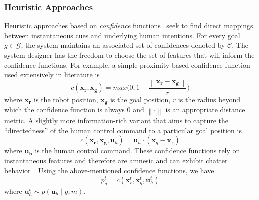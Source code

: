 \documentclass[conference]{IEEEtran}
\newcommand{\norm}[1]{\left\lVert#1\right\rVert}
\begin{document}
\subsubsection{Heuristic Approaches}
Heuristic approaches based on \textit{confidence} functions~\citep{dragan2013policy} seek to find direct mappings between instantaneous cues and underlying human intentions. For every goal $g \in \mathcal{G}$, the system maintains an associated set of confidences denoted by $\mathcal{C}$. The system designer has the freedom to choose the set of features that will inform the confidence functions. For example, a simple proximity-based confidence function used extensively in literature is
\begin{equation*}
c(\boldsymbol{x_r}, \boldsymbol{x_g}) = max\Big(0, 1 - \frac{\norm{\boldsymbol{x_r} - \boldsymbol{x_g}}}{r}\Big)
\end{equation*}
where $\boldsymbol{x_r}$ is the robot position, $\boldsymbol{x_g}$ is the goal position, $r$ is the radius beyond which the confidence function is always 0 and $\norm{\cdot}$ is an appropriate distance metric. 
A slightly more information-rich variant that aims to capture the ``directedness'' of the human control command to a particular goal position is
\begin{equation*}
c({\boldsymbol{x_r},\boldsymbol{x_g}, \boldsymbol{u}_{h}}) = \boldsymbol{u}_h\cdot(\boldsymbol{x}_{g} - \boldsymbol{x_r})
\end{equation*}
where $\boldsymbol{u_h}$ is the human control command. These confidence functions rely on instantaneous features and therefore are amnesic and can exhibit chatter behavior~\citep{dragan2012formalizing}. Using the above-mentioned confidence functions, we have 
\begin{equation}
	p_g^t = c(\boldsymbol{x}_r^t, \boldsymbol{x}_g^t, \boldsymbol{u}_h^t)
\end{equation}
where $\boldsymbol{u}_h^t \sim p(\boldsymbol{u}_h\;|\;g, m)$.  

\end{document}
